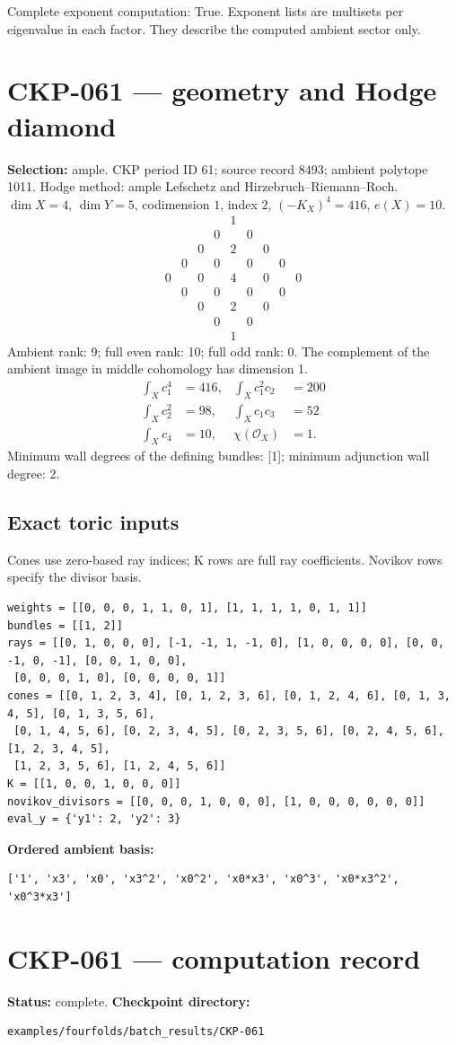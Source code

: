 \documentclass[10pt,a4paper]{article}
\newcommand{\hodge}[4]{\begin{array}{ccccccccc}
&&&&1&&&&\\&&&0&&0&&&\\&&0&&#1&&0&&\\&0&&#2&&#2&&0&\\
0&&#3&&#4&&#3&&0\\&0&&#2&&#2&&0&\\&&0&&#1&&0&&\\&&&0&&0&&&\\&&&&1&&&&\end{array}}
\begin{document}
Complete exponent computation: True.
Exponent lists are multisets per eigenvalue in each factor. They describe the computed ambient sector only.
\clearpage\section*{CKP-061 --- geometry and Hodge diamond}\label{entry:CKP-061}
\textbf{Selection:} ample.
CKP period ID 61; source record 8493; ambient polytope 1011.
Hodge method: ample Lefschetz and Hirzebruch--Riemann--Roch.
$\dim X=4$, $\dim Y=5$, codimension $1$, index $2$, $(-K_X)^4=416$, $e(X)=10$.
\[\hodge{2}{0}{0}{4}\]
Ambient rank: 9; full even rank: 10; full odd rank: 0. The complement of the ambient image in middle cohomology has dimension 1.
\[\begin{aligned}\int_Xc_1^4&=416,&\int_Xc_1^2c_2&=200\\\int_Xc_2^2&=98,&\int_Xc_1c_3&=52\\\int_Xc_4&=10,&\chi(\mathcal O_X)&=1.\end{aligned}\]
Minimum wall degrees of the defining bundles: [1]; minimum adjunction wall degree: 2.
\subsection*{Exact toric inputs}
Cones use zero-based ray indices; K rows are full ray coefficients. Novikov rows specify the divisor basis.

\begin{lstlisting}
weights = [[0, 0, 0, 1, 1, 0, 1], [1, 1, 1, 1, 0, 1, 1]]
bundles = [[1, 2]]
rays = [[0, 1, 0, 0, 0], [-1, -1, 1, -1, 0], [1, 0, 0, 0, 0], [0, 0, -1, 0, -1], [0, 0, 1, 0, 0],
 [0, 0, 0, 1, 0], [0, 0, 0, 0, 1]]
cones = [[0, 1, 2, 3, 4], [0, 1, 2, 3, 6], [0, 1, 2, 4, 6], [0, 1, 3, 4, 5], [0, 1, 3, 5, 6],
 [0, 1, 4, 5, 6], [0, 2, 3, 4, 5], [0, 2, 3, 5, 6], [0, 2, 4, 5, 6], [1, 2, 3, 4, 5],
 [1, 2, 3, 5, 6], [1, 2, 4, 5, 6]]
K = [[1, 0, 0, 1, 0, 0, 0]]
novikov_divisors = [[0, 0, 0, 1, 0, 0, 0], [1, 0, 0, 0, 0, 0, 0]]
eval_y = {'y1': 2, 'y2': 3}
\end{lstlisting}

\textbf{Ordered ambient basis:}
\begin{lstlisting}
['1', 'x3', 'x0', 'x3^2', 'x0^2', 'x0*x3', 'x0^3', 'x0*x3^2', 'x0^3*x3']
\end{lstlisting}

\clearpage\section*{CKP-061 --- computation record}
\textbf{Status:} complete.
\textbf{Checkpoint directory:}
\begin{lstlisting}
examples/fourfolds/batch_results/CKP-061
\end{lstlisting}
\end{document}
